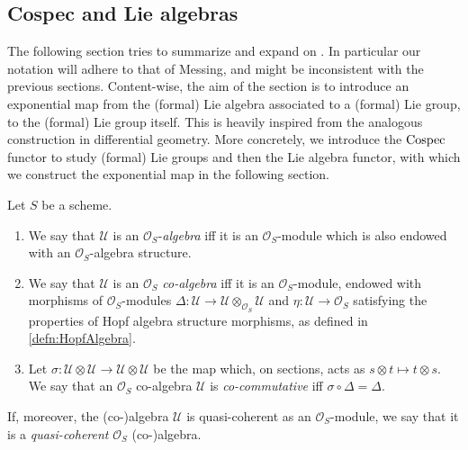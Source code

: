 \subsection{Cospec and Lie algebras}
The following section tries to summarize and expand on \cite[Chapter III]{Messing}.
In particular our notation will adhere to that of Messing, and might
be inconsistent with the previous sections.
Content-wise, the aim of the section is to introduce an exponential map
from the (formal) Lie algebra associated to a (formal) Lie group, to the
(formal) Lie group itself.
This is heavily inspired from the analogous construction in differential geometry.
More concretely, we introduce the \(\operatorname{Cospec}\) functor to study (formal) Lie groups
and then the Lie algebra functor, with which we construct the exponential
map in the following section.


\newpage
\begin{defn}
	Let $S$ be a scheme.
\begin{enumerate}
\item We say that $\mathcal{U}$ is an $\mathcal{O}_{ S }$-\emph{algebra}
	iff it is an $\mathcal{O}_{ S }$-module
	which is also endowed with an $\mathcal{O}_{ S }$-algebra structure.

\item We say that $\mathcal{U}$ is an $\mathcal{O}_{ S }$ \emph{co-algebra}
	iff it is an $\mathcal{O}_{ S }$-module, endowed with
	morphisms of $\mathcal{O}_S$-modules
	$\Delta\colon \mathcal{U} \to \mathcal{U} \otimes_{\mathcal{O}_{ S }} \mathcal{U}$
	and $\eta\colon \mathcal{U} \to \mathcal{O}_{ S }$
	satisfying the properties of Hopf algebra structure morphisms,
	as defined in \cref{defn:HopfAlgebra}.
	
\item Let \(\sigma\colon \mathcal{U} \otimes \mathcal{U} \to \mathcal{U} \otimes \mathcal{U}\) be
	the map which, on sections, acts as \(s \otimes t \mapsto t \otimes s\).
	We say that an \(\mathcal{O}_{ S }\) co-algebra \(\mathcal{U}\)
	is \emph{co-commutative} iff \(\sigma \circ \Delta = \Delta\).
\end{enumerate}
	If, moreover, the (co-)algebra $\mathcal{U}$ is quasi-coherent as an $\mathcal{O}_{ S }$-module,
	we say that it is a \emph{quasi-coherent} $\mathcal{O}_{ S }$ \mbox{(co-)}algebra.
\end{defn}


